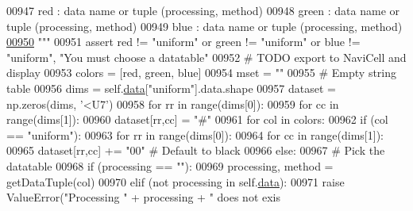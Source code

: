 \begin{DoxyCode}
00947 \textcolor{stringliteral}{            red : data name or tuple (processing, method)}
00948 \textcolor{stringliteral}{            green : data name or tuple (processing, method)}
00949 \textcolor{stringliteral}{            blue : data name or tuple (processing, method)}
\hypertarget{navicom_8py_source_l00950}{}\hyperlink{classnavicom_1_1navicom_1_1NaviCom_a66a4bf5d38161f7ca29f030037b3565b}{00950} \textcolor{stringliteral}{        """}
00951         \textcolor{keyword}{assert} red != \textcolor{stringliteral}{"uniform"} \textcolor{keywordflow}{or} green != \textcolor{stringliteral}{"uniform"} \textcolor{keywordflow}{or} blue != \textcolor{stringliteral}{"uniform"}, \textcolor{stringliteral}{"You 
      must choose a datatable"}
00952         \textcolor{comment}{# TODO export to NaviCell and display}
00953         colors = [red, green, blue]
00954         mset = \textcolor{stringliteral}{""}
00955         \textcolor{comment}{# Empty string table}
00956         dims = self.\hyperlink{classnavicom_1_1navicom_1_1NaviCom_aa1abff245573ed8406c6bddb4596f093}{data}[\textcolor{stringliteral}{"uniform"}].data.shape
00957         dataset = np.zeros(dims, \textcolor{stringliteral}{'<U7'})
00958         \textcolor{keywordflow}{for} rr \textcolor{keywordflow}{in} range(dims[0]):
00959             \textcolor{keywordflow}{for} cc \textcolor{keywordflow}{in} range(dims[1]):
00960                 dataset[rr,cc] = \textcolor{stringliteral}{"#"}
00961         \textcolor{keywordflow}{for} col \textcolor{keywordflow}{in} colors:
00962             \textcolor{keywordflow}{if} (col == \textcolor{stringliteral}{"uniform"}):
00963                 \textcolor{keywordflow}{for} rr \textcolor{keywordflow}{in} range(dims[0]):
00964                     \textcolor{keywordflow}{for} cc \textcolor{keywordflow}{in} range(dims[1]):
00965                         dataset[rr,cc] += \textcolor{stringliteral}{"00"} \textcolor{comment}{# Default to black}
00966             \textcolor{keywordflow}{else}:
00967                 \textcolor{comment}{# Pick the datatable}
00968                 \textcolor{keywordflow}{if} (processing == \textcolor{stringliteral}{""}):
00969                     processing, method = getDataTuple(col)
00970                 \textcolor{keywordflow}{elif} (\textcolor{keywordflow}{not} processing \textcolor{keywordflow}{in} self.\hyperlink{classnavicom_1_1navicom_1_1NaviCom_aa1abff245573ed8406c6bddb4596f093}{data}):
00971                     \textcolor{keywordflow}{raise} ValueError(\textcolor{stringliteral}{"Processing "} + processing + \textcolor{stringliteral}{" does not exis
}
\end{DoxyCode}
